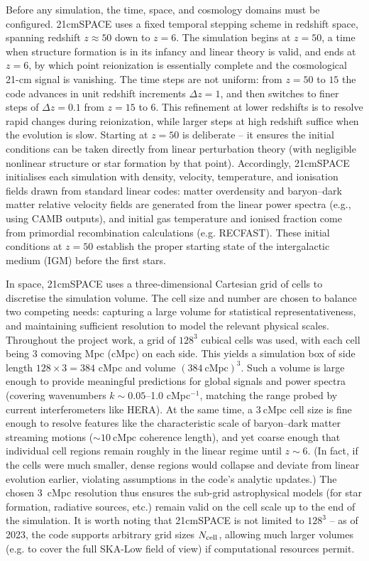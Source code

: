 \documentclass[floats,floatfix,showpacs,amssymb,prd,superscriptaddress,nofootinbib]{revtex4-2} %
\begin{document}
Before any simulation, the time, space, and cosmology domains must be configured. 21cmSPACE uses a fixed temporal stepping scheme in redshift space, spanning redshift $z\approx50$ down to $z=6$. The simulation begins at $z=50$, a time when structure formation is in its infancy and linear theory is valid, and ends at $z=6$, by which point reionization is essentially complete and the cosmological 21-cm signal is vanishing. The time steps are not uniform: from $z=50$ to $15$ the code advances in unit redshift increments $\Delta z=1$, and then switches to finer steps of $\Delta z=0.1$ from $z=15$ to $6$. This refinement at lower redshifts is to resolve rapid changes during reionization, while larger steps at high redshift suffice when the evolution is slow. Starting at $z=50$ is deliberate – it ensures the initial conditions can be taken directly from linear perturbation theory (with negligible nonlinear structure or star formation by that point). Accordingly, 21cmSPACE initialises each simulation with density, velocity, temperature, and ionisation fields drawn from standard linear codes: matter overdensity and baryon–dark matter relative velocity fields are generated from the linear power spectra (e.g., using CAMB outputs), and initial gas temperature and ionised fraction come from primordial recombination calculations (e.g. RECFAST). These initial conditions at $z=50$ establish the proper starting state of the intergalactic medium (IGM) before the first stars.

In space, 21cmSPACE uses a three-dimensional Cartesian grid of cells to discretise the simulation volume. The cell size and number are chosen to balance two competing needs: capturing a large volume for statistical representativeness, and maintaining sufficient resolution to model the relevant physical scales. Throughout the project work, a grid of $128^3$ cubical cells was used, with each cell being 3 comoving Mpc (cMpc) on each side. This yields a simulation box of side length $128\times3 = 384$ cMpc and volume $(384~\text{cMpc})^3$. Such a volume is large enough to provide meaningful predictions for global signals and power spectra (covering wavenumbers $k \sim 0.05$–1.0 cMpc$^{-1}$, matching the range probed by current interferometers like HERA). At the same time, a $3~\text{cMpc}$ cell size is fine enough to resolve features like the characteristic scale of baryon–dark matter streaming motions ($\sim 10~\text{cMpc}$ coherence length), and yet coarse enough that individual cell regions remain roughly in the linear regime until $z\sim6$. (In fact, if the cells were much smaller, dense regions would collapse and deviate from linear evolution earlier, violating assumptions in the code’s analytic updates.) The chosen 3 cMpc resolution thus ensures the sub-grid astrophysical models (for star formation, radiative sources, etc.) remain valid on the cell scale up to the end of the simulation. It is worth noting that 21cmSPACE is not limited to $128^3$ – as of 2023, the code supports arbitrary grid sizes $N_{\rm cell}$, allowing much larger volumes (e.g. to cover the full SKA-Low field of view) if computational resources permit.
\end{document}

